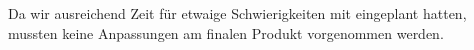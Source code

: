 Da wir ausreichend Zeit für etwaige Schwierigkeiten mit eingeplant hatten, mussten keine Anpassungen am finalen Produkt vorgenommen werden.